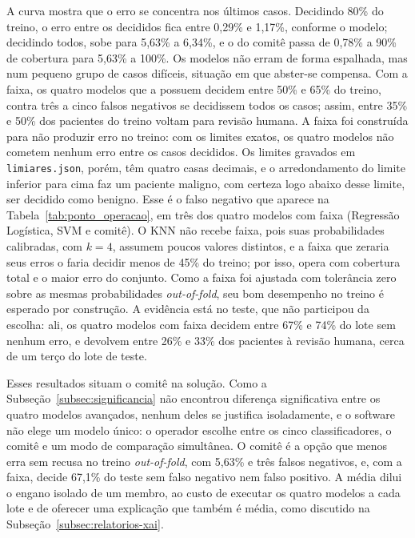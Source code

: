 \documentclass[
    12pt
    ,oneside
    ,a4paper
    ,chapter=TITLE
    ,section=TITLE
    ,sumario=abnt-6027-2012
    ,english,brazil]{abntex2} %
\begin{document}
A curva mostra que o erro se concentra nos últimos casos. Decidindo 80\% do treino, o erro entre os decididos fica entre 0,29\% e 1,17\%, conforme o modelo; decidindo todos, sobe para 5,63\% a 6,34\%, e o do comitê passa de 0,78\% a 90\% de cobertura para 5,63\% a 100\%. Os modelos não erram de forma espalhada, mas num pequeno grupo de casos difíceis, situação em que abster-se compensa. Com a faixa, os quatro modelos que a possuem decidem entre 50\% e 65\% do treino, contra três a cinco falsos negativos se decidissem todos os casos; assim, entre 35\% e 50\% dos pacientes do treino voltam para revisão humana. A faixa foi construída para não produzir erro no treino: com os limites exatos, os quatro modelos não cometem nenhum erro entre os casos decididos. Os limites gravados em \texttt{limiares.json}, porém, têm quatro casas decimais, e o arredondamento do limite inferior para cima faz um paciente maligno, com certeza logo abaixo desse limite, ser decidido como benigno. Esse é o falso negativo que aparece na Tabela~\ref{tab:ponto_operacao}, em três dos quatro modelos com faixa (Regressão Logística, SVM e comitê). O KNN não recebe faixa, pois suas probabilidades calibradas, com $k = 4$, assumem poucos valores distintos, e a faixa que zeraria seus erros o faria decidir menos de 45\% do treino; por isso, opera com cobertura total e o maior erro do conjunto. Como a faixa foi ajustada com tolerância zero sobre as mesmas probabilidades \textit{out-of-fold}, seu bom desempenho no treino é esperado por construção. A evidência está no teste, que não participou da escolha: ali, os quatro modelos com faixa decidem entre 67\% e 74\% do lote sem nenhum erro, e devolvem entre 26\% e 33\% dos pacientes à revisão humana, cerca de um terço do lote de teste.

Esses resultados situam o comitê na solução. Como a
Subseção~\ref{subsec:significancia} não encontrou diferença significativa entre
os quatro modelos avançados, nenhum deles se justifica isoladamente, e o
software não elege um modelo único: o operador escolhe entre os cinco
classificadores, o comitê e um modo de comparação simultânea. O comitê é a
opção que menos erra sem recusa no treino \textit{out-of-fold}, com 5,63\% e
três falsos negativos, e, com a faixa, decide 67,1\% do teste sem falso
negativo nem falso positivo. A média dilui o engano isolado de um membro, ao
custo de executar os quatro modelos a cada lote e de oferecer uma explicação
que também é média, como discutido na Subseção~\ref{subsec:relatorios-xai}.

\end{document}
